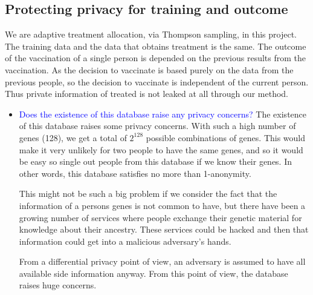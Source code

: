 \subsection*{Protecting privacy for training and outcome}
We are adaptive treatment allocation, via Thompson sampling, in this project. The training data and the data that obtains treatment is the same. The outcome of the vaccination of a single person is depended on the previous results from the vaccination. 
As the decision to vaccinate is based purely on the data from the previous people, so the decision to vaccinate is independent of the current person. Thus private information of treated is not leaked at all through our method. 
\begin{itemize}
    \item \textcolor{blue}{Does the existence of this database raise any privacy concerns?}
    The existence of this database raises some privacy concerns. With such a high number of genes (128), we get a total of $2^{128}$ possible combinations of genes. This would make it very unlikely for two people to have the same genes, and so it would be easy so single out people from this database if we know their genes. In other words, this database satisfies no more than 1-anonymity. 
    
    This might not be such a big problem if we consider the fact that the information of a persons genes is not common to have, but there have been a growing number of services where people exchange their genetic material for knowledge about their ancestry. These services could be hacked and then that information could get into a malicious adversary's hands. 
    
    From a differential privacy point of view, an adversary is assumed to have all available side information anyway. From this point of view, the database raises huge concerns. 
    

\end{itemize}

